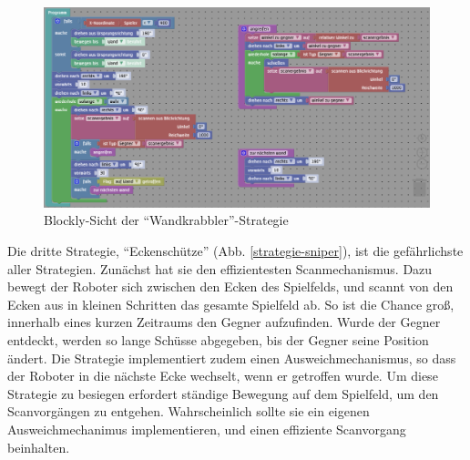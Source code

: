 \begin{figure}
  \centering
  \label{strategie-wandkrabbler}
  \includegraphics[scale=1, keepaspectratio]{figures/strategy-wandkrabbler.png}
  \caption{Blockly-Sicht der \enquote{Wandkrabbler}-Strategie}
\end{figure}

Die dritte Strategie, \enquote{Eckenschütze} (Abb. \ref{strategie-sniper}), ist die
gefährlichste aller Strategien. Zunächst hat sie den effizientesten Scanmechanismus. Dazu bewegt der
Roboter sich zwischen den Ecken des Spielfelds, und scannt von den Ecken aus in kleinen Schritten
das gesamte Spielfeld ab. So ist die Chance groß, innerhalb eines kurzen Zeitraums den Gegner
aufzufinden. Wurde der Gegner entdeckt, werden so lange Schüsse abgegeben, bis der Gegner seine
Position ändert. Die Strategie implementiert zudem einen Ausweichmechanismus, so dass der Roboter in die
nächste Ecke wechselt, wenn er getroffen wurde. Um diese Strategie zu besiegen erfordert ständige
Bewegung auf dem Spielfeld, um den Scanvorgängen zu entgehen. Wahrscheinlich sollte sie ein eigenen
Ausweichmechanimus implementieren, und einen effiziente Scanvorgang beinhalten.

